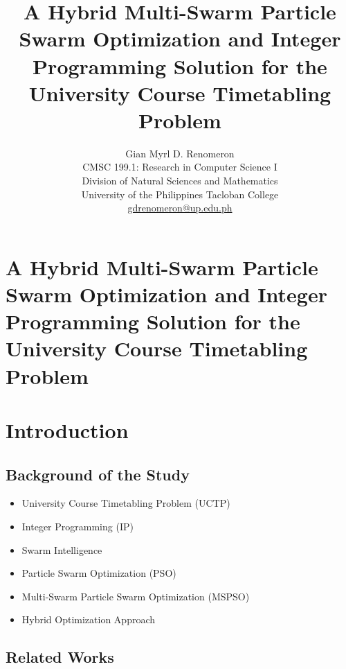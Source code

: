 \documentclass{article}
\newenvironment{subs}
  {\adjustwidth{3em}{0pt}}
  {\endadjustwidth}
\begin{document}
\title{\textbf{A Hybrid Multi-Swarm Particle Swarm Optimization and Integer Programming Solution for the University Course Timetabling Problem}}
\author{Gian Myrl D. Renomeron\\
    CMSC 199.1: Research in Computer Science I\\
    Division of Natural Sciences and Mathematics\\
    University of the Philippines Tacloban College\\
    {\small \href{mailto:gdrenomeron@up.edu.ph}{gdrenomeron@up.edu.ph}}
}
\date{}

\maketitle
\pagebreak
    \section*{A Hybrid Multi-Swarm Particle Swarm Optimization and Integer Programming Solution for the University Course Timetabling Problem}

\section{Introduction}
\label{sec:introduction}
\begin{subs}
\subsection{Background of the Study}
\label{subsec:background}
\begin{itemize}
    \item[] University Course Timetabling Problem (UCTP)
    \item[] Integer Programming (IP)
    \item[] Swarm Intelligence
    \item[] Particle Swarm Optimization (PSO)
    \item[] Multi-Swarm Particle Swarm Optimization (MSPSO)
    \item[] Hybrid Optimization Approach
\end{itemize}


\subsection{Related Works}
\label{subsec:relatedworks}


\end{subs}
\end{document}
